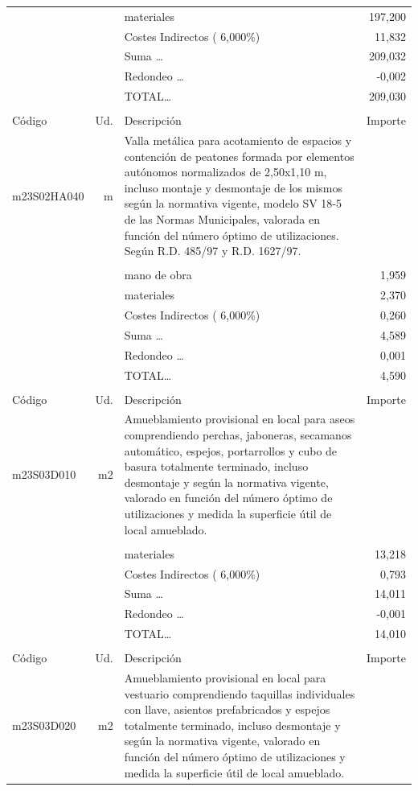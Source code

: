 \documentclass{book}%
\begin{document}
\begin{supertabular}{l r p{60mm} r}
&&materiales&   197,200\\%
&&Costes Indirectos (     6,000\%)&    11,832\\%
&&Suma \ldots&   209,032\\%
&&Redondeo \ldots&    {-}0,002\\%
%
&&TOTAL\ldots&   209,030\\%
&&&\\%
Código&Ud.&Descripción&Importe\\%
\hline%
m23S02HA040&m&Valla metálica para acotamiento de espacios y contención de peatones formada por elementos autónomos normalizados de 2,50x1,10 m, incluso montaje y desmontaje de los mismos según la normativa vigente, modelo SV 18{-}5 de las Normas Municipales, valorada en función del número óptimo de utilizaciones. Según R.D. 485/97 y R.D. 1627/97.&\\%
&&&\\%
&&mano de obra&     1,959\\%
&&materiales&     2,370\\%
&&Costes Indirectos (     6,000\%)&     0,260\\%
&&Suma \ldots&     4,589\\%
&&Redondeo \ldots&     0,001\\%
%
&&TOTAL\ldots&     4,590\\%
&&&\\%
Código&Ud.&Descripción&Importe\\%
\hline%
m23S03D010&m2&Amueblamiento provisional en local para aseos comprendiendo perchas, jaboneras, secamanos automático, espejos, portarrollos y cubo de basura totalmente terminado, incluso desmontaje y según la normativa vigente, valorado en función del número óptimo de utilizaciones y medida la superficie útil de local amueblado.&\\%
&&&\\%
&&materiales&    13,218\\%
&&Costes Indirectos (     6,000\%)&     0,793\\%
&&Suma \ldots&    14,011\\%
&&Redondeo \ldots&    {-}0,001\\%
%
&&TOTAL\ldots&    14,010\\%
&&&\\%
Código&Ud.&Descripción&Importe\\%
\hline%
m23S03D020&m2&Amueblamiento provisional en local para vestuario comprendiendo taquillas individuales con llave, asientos prefabricados y espejos totalmente terminado, incluso desmontaje y según la normativa vigente, valorado en función del número óptimo de utilizaciones y medida la superficie útil de local amueblado.&\\%

\end{supertabular}
\end{document}
